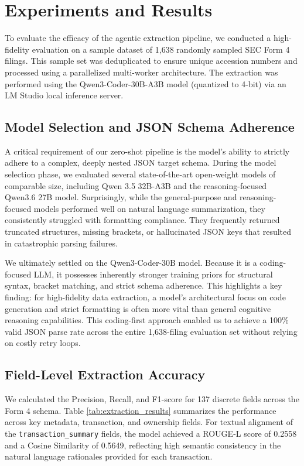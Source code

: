 \documentclass[journal, onecolumn]{IEEEtran}
\begin{document}
\section{Experiments and Results}
To evaluate the efficacy of the agentic extraction pipeline, we conducted a high-fidelity evaluation on a sample dataset of 1,638 randomly sampled SEC Form 4 filings. This sample set was deduplicated to ensure unique accession numbers and processed using a parallelized multi-worker architecture. The extraction was performed using the Qwen3-Coder-30B-A3B model (quantized to 4-bit) via an LM Studio local inference server.

\subsection{Model Selection and JSON Schema Adherence}
A critical requirement of our zero-shot pipeline is the model's ability to strictly adhere to a complex, deeply nested JSON target schema. During the model selection phase, we evaluated several state-of-the-art open-weight models of comparable size, including Qwen 3.5 32B-A3B and the reasoning-focused Qwen3.6 27B model. Surprisingly, while the general-purpose and reasoning-focused models performed well on natural language summarization, they consistently struggled with formatting compliance. They frequently returned truncated structures, missing brackets, or hallucinated JSON keys that resulted in catastrophic parsing failures. 

We ultimately settled on the Qwen3-Coder-30B model. Because it is a coding-focused LLM, it possesses inherently stronger training priors for structural syntax, bracket matching, and strict schema adherence. This highlights a key finding: for high-fidelity data extraction, a model's architectural focus on code generation and strict formatting is often more vital than general cognitive reasoning capabilities. This coding-first approach enabled us to achieve a 100\% valid JSON parse rate across the entire 1,638-filing evaluation set without relying on costly retry loops.

\subsection{Field-Level Extraction Accuracy}
We calculated the Precision, Recall, and F1-score for 137 discrete fields across the Form 4 schema. Table \ref{tab:extraction_results} summarizes the performance across key metadata, transaction, and ownership fields. For textual alignment of the \texttt{transaction\_summary} fields, the model achieved a ROUGE-L score of 0.2558 and a Cosine Similarity of 0.5649, reflecting high semantic consistency in the natural language rationales provided for each transaction.
\end{document}
